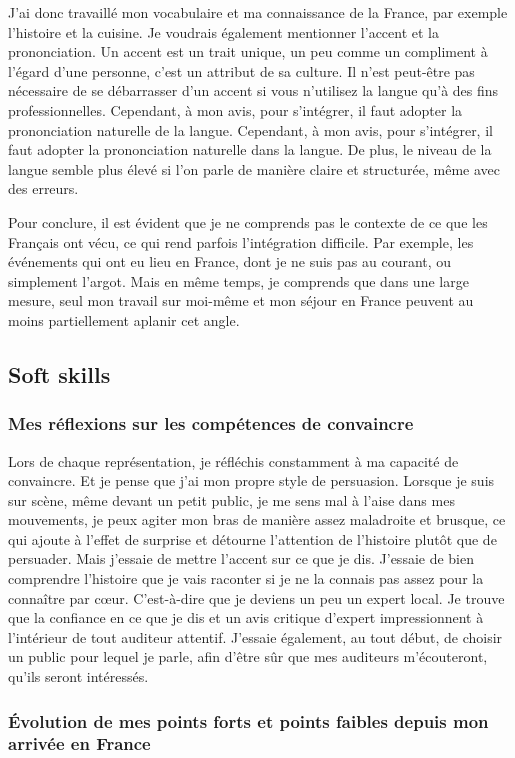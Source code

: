 \documentclass[a4paper,12pt]{article}
\begin{document}
J'ai donc travaillé mon vocabulaire et ma connaissance de la France, par exemple l'histoire et la cuisine. Je voudrais également mentionner l'accent et la prononciation. Un accent est un trait unique, un peu comme un compliment à l'égard d'une personne, c'est un attribut de sa culture. Il n'est peut-être pas nécessaire de se débarrasser d'un accent si vous n'utilisez la langue qu'à des fins professionnelles. Cependant, à mon avis, pour s'intégrer, il faut adopter la prononciation naturelle de la langue. Cependant, à mon avis, pour s'intégrer, il faut adopter la prononciation naturelle dans la langue. De plus, le niveau de la langue semble plus élevé si l'on parle de manière claire et structurée, même avec des erreurs. 

Pour conclure, il est évident que je ne comprends pas le contexte de ce que les Français ont vécu, ce qui rend parfois l'intégration difficile. Par exemple, les événements qui ont eu lieu en France, dont je ne suis pas au courant, ou simplement l'argot. Mais en même temps, je comprends que dans une large mesure, seul mon travail sur moi-même et mon séjour en France peuvent au moins partiellement aplanir cet angle. 


\subsection{Soft skills}
%	
\subsubsection{Mes réflexions sur les compétences de convaincre}

Lors de chaque représentation, je réfléchis constamment à ma capacité de convaincre. Et je pense que j'ai mon propre style de persuasion. Lorsque je suis sur scène, même devant un petit public, je me sens mal à l'aise dans mes mouvements, je peux agiter mon bras de manière assez maladroite et brusque, ce qui ajoute à l'effet de surprise et détourne l'attention de l'histoire plutôt que de persuader. Mais j'essaie de mettre l'accent sur ce que je dis. J'essaie de bien comprendre l'histoire que je vais raconter si je ne la connais pas assez pour la connaître par cœur. C'est-à-dire que je deviens un peu un expert local. Je trouve que la confiance en ce que je dis et un avis critique d'expert impressionnent à l'intérieur de tout auditeur attentif. J'essaie également, au tout début, de choisir un public pour lequel je parle, afin d'être sûr que mes auditeurs m'écouteront, qu'ils seront intéressés. 
\subsubsection{Évolution de mes points forts et points faibles depuis mon arrivée en France}
\end{document}
